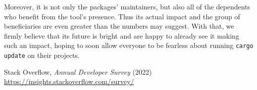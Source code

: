 \documentclass[licencjacka,en]{pracamgr}
\begin{document}
Moreover, it is not only the packages' maintainers, but also all of the dependents who benefit
from the tool's presence. Thus its actual impact and the group of beneficiaries are even greater
than the numbers may suggest. With that, we firmly believe that its future is bright and are happy
to already see it making such an impact, hoping to soon allow everyone to be fearless about running
\texttt{cargo update} on their projects.


\appendix

\begin{thebibliography}{99}







 Stack Overflow,
	\textit{Annual Developer Survey} (2022) \\
	\url{https://insights.stackoverflow.com/survey/}









\end{thebibliography}
\end{document}
